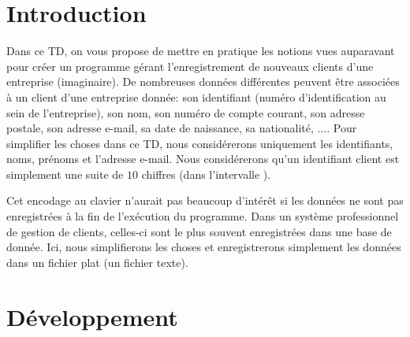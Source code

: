 \documentclass[a4paper,11pt]{article}
\date{2018 -- 2019}
\begin{document}
\entete
\titre
{}
\lastedit

\vspace{0.5cm}

	
\section{Introduction}

	Dans ce TD, on vous propose de mettre en pratique les notions vues auparavant pour créer un programme gérant l'enregistrement de nouveaux clients d'une entreprise (imaginaire). De nombreuses données différentes peuvent être associées à un client d'une entreprise donnée: son identifiant (numéro d'identification au sein de l'entreprise), son nom, son numéro de compte courant, son adresse postale, son adresse e-mail, sa date de naissance, sa nationalité, .... Pour simplifier les choses dans ce TD, nous considérerons uniquement les identifiants, noms, prénoms et l'adresse e-mail.
Nous considérerons qu'un identifiant client est simplement une suite de $10$ chiffres (dans l'intervalle ).

Cet encodage au clavier n'aurait pas beaucoup d'int\'er\^et si les donn\'ees ne sont pas enregistr\'ees \`a la fin de l'ex\'ecution du programme. Dans un syst\`eme professionnel de gestion de clients, celles-ci sont le plus souvent enregistr\'ees dans une base de donn\'ee. Ici, nous simplifierons les choses et enregistrerons simplement les donn\'ees dans un fichier plat (un fichier texte).

\section{D\'eveloppement}
	
	
	
	
\end{document}
